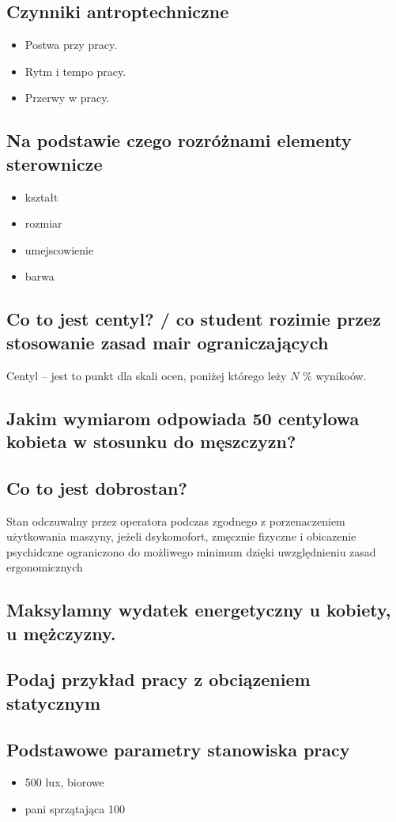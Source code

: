 \documentclass[11pt]{article}
\begin{document}
\subsection{Czynniki antroptechniczne}
\label{sec:org35d9ad1}
\begin{itemize}
\item Postwa przy pracy.
\item Rytm i tempo pracy.
\item Przerwy w pracy.
\end{itemize}
\subsection{Na podstawie czego rozróżnami elementy sterownicze}
\label{sec:orga6d0479}
\begin{itemize}
\item kształt
\item rozmiar
\item umejscowienie
\item barwa
\end{itemize}
\subsection{Co to jest centyl? / co student rozimie przez stosowanie zasad mair ograniczających}
\label{sec:orgc454bb5}
Centyl -- jest to punkt dla skali ocen, poniżej którego leży \(N\) \% wynikoów.
\subsection{Jakim wymiarom odpowiada 50 centylowa kobieta w stosunku do męszczyzn?}
\label{sec:org6bb0230}
\subsection{Co to jest dobrostan?}
\label{sec:orge8e4086}
Stan odczuwalny przez operatora podczas zgodnego z porzenaczeniem użytkowania maszyny, jeżeli dsykomofort, zmęcznie fizyczne i obicazenie psychidczne ograniczono do możliwego minimum dzięki uwzględnieniu zasad ergonomicznych
\subsection{Maksylamny wydatek energetyczny u kobiety, u mężczyzny.}
\label{sec:orgaffaaec}
\subsection{Podaj przykład pracy z obciązeniem statycznym}
\label{sec:org72aa1ee}
\subsection{Podstawowe parametry stanowiska pracy}
\label{sec:org7127633}
\begin{itemize}
\item 500 lux, biorowe
\item pani sprzątająca 100
\end{itemize}
\end{document}
